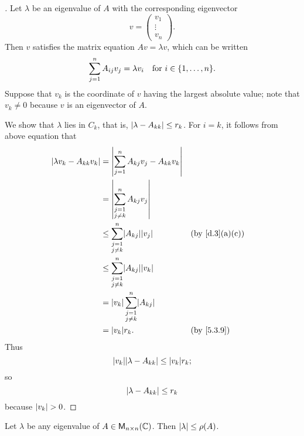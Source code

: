\begin{proof}[]
  Let \(\lambda\) be an eigenvalue of \(A\) with the corresponding eigenvector
  \[
    v = \begin{pmatrix}
      v_1    \\
      \vdots \\
      v_n
    \end{pmatrix}.
  \]
  Then \(v\) satisfies the matrix equation \(Av = \lambda v\), which can be written
  \[
    \sum_{j = 1}^n A_{i j} v_j = \lambda v_i \quad \text{for } i \in \set{1, \dots, n}.
  \]
  Suppose that \(v_k\) is the coordinate of \(v\) having the largest absolute value;
  note that \(v_k \neq 0\) because \(v\) is an eigenvector of \(A\).

  We show that \(\lambda\) lies in \(C_k\), that is, \(\left\lvert\lambda - A_{k k}\right\rvert \leq r_k\).
  For \(i = k\), it follows from above equation that
  \begin{align*}
    \abs{\lambda v_k - A_{k k} v_k} & = \abs{\sum_{j = 1}^n A_{k j} v_j - A_{k k} v_k}                               \\
                                    & = \abs{\sum_{\substack{j = 1                                                   \\ j \neq k}}^n A_{k j} v_j}              \\
                                    & \leq \sum_{\substack{j = 1                                                     \\ j \neq k}}^n \abs{A_{k j}} \abs{v_j}    && \text{(by \cref{d.3}(a)(c))} \\
                                    & \leq \sum_{\substack{j = 1                                                     \\ j \neq k}}^n \abs{A_{k j}} \abs{v_k}     \\
                                    & = \abs{v_k} \sum_{\substack{j = 1                                              \\ j \neq k}}^n \abs{A_{k j}}        \\
                                    & = \abs{v_k} r_k.                                 &  & \text{(by \cref{5.3.9})}
  \end{align*}
  Thus
  \[
    \abs{v_k} \abs{\lambda - A_{k k}} \leq \abs{v_k} r_k;
  \]
  so
  \[
    \left\lvert\lambda - A_{k k}\right\rvert \leq r_k
  \]
  because \(\left\lvert v_k\right\rvert > 0\).
\end{proof}

\begin{cor}\label{5.3.10}
  Let \(\lambda\) be any eigenvalue of \(A \in \mathsf{M}_{{n} \times n}({\mathbb{C}})\).
  Then \(\left\lvert\lambda\right\rvert \leq \rho(A)\).
\end{cor}

